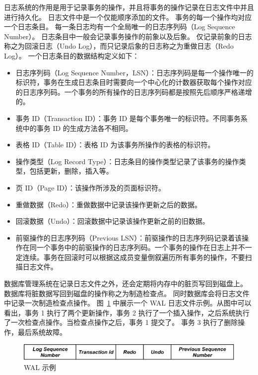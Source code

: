 日志系统的作用是用于记录事务的操作，并且将事务的操作记录在日志文件中并且进行持久化。
日志文件中是一个仅能顺序添加的文件。
事务的每一个操作均对应一个日志条目。
每一条日志均有一个全局唯一的日志序列码（Log Sequence Number）。
日志条目中一般会记录事务操作的前象以及后象。
仅记录前象的日志称之为回滚日志（Undo Log），而只记录后象的日志称之为重做日志（Redo Log）。
一个日志条目的数据结构定义如下：
\begin{itemize}
    \item 日志序列码（Log Sequence Number，LSN）：日志序列码是每一个操作唯一的标识符，事务在生成日志条目时需要向一个中心化的计数器获取每个操作对应的日志序列码。一个事务的所有操作的日志序列码都是按照先后顺序严格递增的。
    \item 事务 ID（Transaction ID）：事务 ID 是每个事务唯一的标识符。不同事务系统中的事务 ID 的生成方法各不相同。
    \item 表格 ID（Table ID）：表格 ID 为该事务所操作的表格的标识符。
    \item 操作类型（Log Record Type）：日志条目的操作类型记录了该事务的操作类型，包括更新，删除，插入等。
    \item 页 ID（Page ID）：该操作所涉及的页面标识符。
    \item 重做数据（Redo）：重做数据中记录该操作更新之后的数据。
    \item 回滚数据（Undo）：回滚数据中记录该操作更新之前的旧数据。
    \item 前驱操作的日志序列码（Previous LSN）：前驱操作的日志序列码记录着该操作在同一个事务中的前驱操作的日志序列码。一个事务的操作在日志上并不一定连续。事务在回滚时可以根据这成员变量倒叙遍历所有事务的操作，不要扫描日志文件。
\end{itemize}


数据库管理系统在记录日志文件之外，还会定期将内存中的脏页写回到磁盘上。
数据库将脏数据写回到磁盘的操作称之为制造检查点。
同时数据库会将日志文件中记录一次制造检查点操作。
图~\ref{fig:wal} 中展示一个 WAL 日志文件示例。从图中可以看出，事务 1 执行了两个更新操作，事务 2 执行了一个插入操作，之后系统执行了一次检查点操作。当检查点操作之后，事务 1 提交了。
事务 3 执行了删除操作，最后系统故障。


\begin{figure}
    \centering
    \includegraphics[width=1\linewidth]{figures/log_entry.pdf}
    \caption{WAL 示例}
    \label{fig:wal}
\end{figure}

